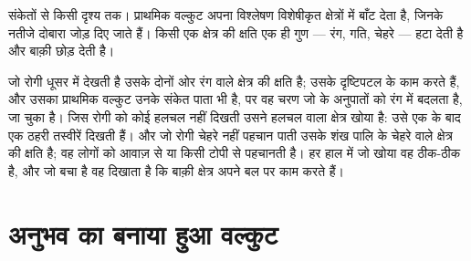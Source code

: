 \begin{omfigure}

{\small संकेतों से किसी दृश्य तक। प्राथमिक वल्कुट अपना विश्लेषण विशेषीकृत
क्षेत्रों में बाँट देता है, जिनके नतीजे दोबारा जोड़ दिए जाते हैं। किसी एक
क्षेत्र की क्षति एक ही गुण --- रंग, गति, चेहरे --- हटा देती है और बाक़ी
छोड़ देती है।}
\end{omfigure}

\begin{example}[तीन रोगी, तीन क्षेत्र]\label{ex:g11:vision-and-brain:patients}
जो रोगी धूसर में देखती है उसके दोनों ओर रंग वाले क्षेत्र की क्षति है; उसके
दृष्टिपटल के  काम करते हैं, और उसका प्राथमिक वल्कुट उनके संकेत पाता भी
है, पर वह चरण जो  के अनुपातों को रंग में बदलता है, जा चुका है। जिस
रोगी को कोई हलचल नहीं दिखती उसने हलचल वाला क्षेत्र खोया है: उसे एक के बाद
एक ठहरी तस्वीरें दिखती हैं। और जो रोगी चेहरे नहीं पहचान पाती उसके शंख पालि
के चेहरे वाले क्षेत्र की क्षति है; वह लोगों को आवाज़ से या किसी टोपी से
पहचानती है। हर हाल में जो खोया वह ठीक-ठीक है, और जो बचा है वह दिखाता है कि
बाक़ी क्षेत्र अपने बल पर काम करते हैं।
\end{example}

\section{अनुभव का बनाया हुआ वल्कुट}

